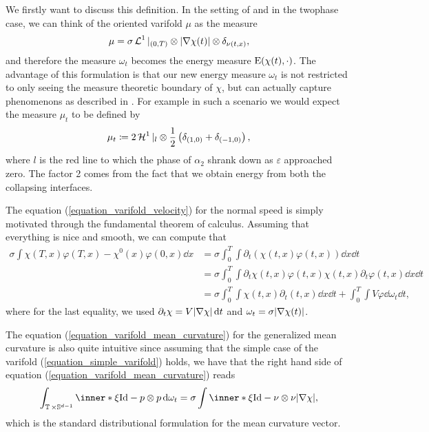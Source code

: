We firstly want to discuss this definition. In the setting of 
 and in the twophase case, we can think of the 
oriented varifold $ \mu $ as the measure 
\begin{equation} 
	\label{equation_simple_varifold}
\mu =
\sigma \operatorname{\mathcal{L}}^{ 1 } |_{ 
( 0 , T ) } \otimes \abs{ \nabla \chi  ( t ) } 
\otimes \delta_{ \nu ( t , x ) }, 
\end{equation}
and therefore the measure $ \omega_{ t } $ 
becomes the energy measure $ \operatorname{E} ( \chi ( t ) , \cdot ) $.
The advantage of this formulation is that our new energy measure $ \omega_{ t } 
$ is not restricted to only seeing the measure theoretic boundary of $ \chi $, 
but can actually capture phenomenons as described in 
.
For example in such a scenario we would expect the measure $ \mu_{ t } $ to be 
defined by
\begin{equation}
	\label{equation_mu_in_figure}
	\mu_{ t } \coloneqq
	2 \operatorname{\mathcal{H}}^{ 1 } |_{ l } \otimes \frac{ 1 }{ 2 } \left( \delta_{ ( 1 , 0 ) } + 
\delta_{ ( - 1 , 0 ) }\right) ,
\end{equation}
where $ l $ is the red line to which the phase 
of $ \alpha_{ 2 } $ shrank down as $ \varepsilon $ approached zero. The factor 
2 comes from the fact that we obtain energy from both the collapsing interfaces.

The equation (\ref{equation_varifold_velocity}) for the  normal speed is simply 
motivated through 
the fundamental theorem of calculus. Assuming that everything is nice and 
smooth, we can compute that 
\begin{align*}
	\sigma \int
		\chi ( T , x ) \varphi ( T , x ) - \chi^{ 0 } ( x ) \varphi ( 0 , x )
	\dd{ x }
	& =
	\sigma \int_{ 0 }^{ T }
		\int
			\partial_{ t } \left(
				\chi ( t , x ) \varphi ( t , x )
			\right)
		\dd{ x }
	\dd{ t }
	\\
	&=
	\sigma \int_{ 0 }^{ T }
		\int
			\partial_{ t } \chi ( t , x ) \varphi ( t , x )
			\chi ( t , x ) \partial_{ t } \varphi ( t , x )
		\dd{ x }
	\dd{ t }
	\\
	& =
	\sigma \int_{ 0 }^{ T }
		\int
			\chi ( t , x )
			\partial_{ t } ( t , x )
		\dd{ x }
	\dd{ t }
	+
	\int_{ 0 }^{ T }
		\int
			V \varphi 
		\dd{ \omega_{ t} }
	\dd{ t },
\end{align*}
where for the last equality, we used $ \partial_{ t } \chi = V \abs{ \nabla 
\chi } \dd{ t } $ and $ \omega_{ t } = \sigma \abs{ \nabla \chi ( t ) } $.

The equation (\ref{equation_varifold_mean_curvature}) for the generalized mean 
curvature is also quite intuitive since 
assuming that the simple case of the varifold (\ref{equation_simple_varifold}) 
holds, we have that the right hand side of equation 
(\ref{equation_varifold_mean_curvature}) reads
\begin{equation*}
	\int_{ \flattorus \times \mathbb{ S }^{ d - 1 } }
		\inner*{ \xi }{ \mathrm{Id} - p \otimes p }
	\dd{ \omega_{ t } }
	=
	\sigma
	\int
		\inner*{ \xi }{\mathrm{Id} - \nu \otimes \nu }
	\abs{ \nabla \chi },
\end{equation*}
which is the standard distributional formulation for the mean curvature vector.

